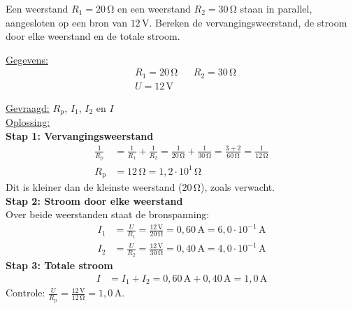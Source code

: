 \documentclass{ximera}
\begin{document}
\begin{example}[foldable=true,title={Voorbeeld: twee weerstanden in parallel}]\nl
    Een weerstand $R_1 = 20\,\mathrm{\Omega}$ en een weerstand $R_2 = 30\,\mathrm{\Omega}$ staan in parallel, aangesloten op een bron van $12\,\mathrm{V}$. Bereken de vervangingsweerstand, de stroom door elke weerstand en de totale stroom.

    \begin{solution}\nl
        \underline{Gegevens:}
        \begin{align*}
            & R_1 = 20\,\mathrm{\Omega} & & R_2 = 30\,\mathrm{\Omega} \\
            & U = 12\,\mathrm{V} & &
        \end{align*}

        \underline{Gevraagd:} $R_{\text{p}}$, $I_1$, $I_2$ en $I$ \\

        \underline{Oplossing:}\\
        \textbf{Stap 1: Vervangingsweerstand}\\
        \begin{align*}
            \frac{1}{R_{\text{p}}} &= \frac{1}{R_1} + \frac{1}{R_2} = \frac{1}{20\,\mathrm{\Omega}} + \frac{1}{30\,\mathrm{\Omega}} = \frac{3 + 2}{60\,\mathrm{\Omega}} = \frac{1}{12\,\mathrm{\Omega}} \\
            R_{\text{p}} &= 12\,\mathrm{\Omega} = \boxed{1{,}2 \cdot 10^{1}\,\mathrm{\Omega}}
        \end{align*}
        Dit is kleiner dan de kleinste weerstand ($20\,\mathrm{\Omega}$), zoals verwacht.\\
        \textbf{Stap 2: Stroom door elke weerstand}\\
        Over beide weerstanden staat de bronspanning:
        \begin{align*}
            I_1 &= \frac{U}{R_1} = \frac{12\,\mathrm{V}}{20\,\mathrm{\Omega}} = 0{,}60\,\mathrm{A} = \boxed{6{,}0 \cdot 10^{-1}\,\mathrm{A}} \\
            I_2 &= \frac{U}{R_2} = \frac{12\,\mathrm{V}}{30\,\mathrm{\Omega}} = 0{,}40\,\mathrm{A} = \boxed{4{,}0 \cdot 10^{-1}\,\mathrm{A}}
        \end{align*}
        \textbf{Stap 3: Totale stroom}\\
        \begin{align*}
            I &= I_1 + I_2 = 0{,}60\,\mathrm{A} + 0{,}40\,\mathrm{A} = \boxed{1{,}0\,\mathrm{A}}
        \end{align*}
        Controle: $\frac{U}{R_{\text{p}}} = \frac{12\,\mathrm{V}}{12\,\mathrm{\Omega}} = 1{,}0\,\mathrm{A}$.
    \end{solution}
\end{example}
\end{document}
